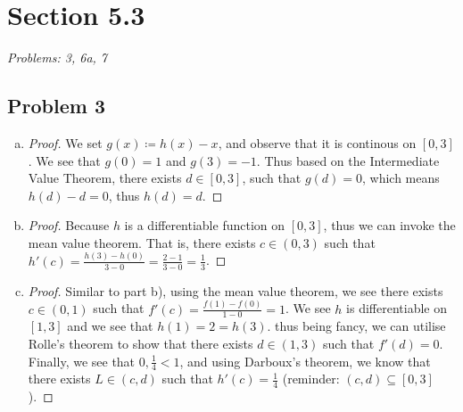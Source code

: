 \documentclass[12pt]{article}
\begin{document}

\section*{Section 5.3}
\textit{Problems: 3, 6a, 7}
\subsection*{Problem 3}
\begin{enumerate}[a).]
    \item {
        \begin{proof}
            We set $g(x) \coloneq h(x) - x$, and observe that it is continous on $[0,3]$.
            We see that $g(0) = 1$ and $g(3) = -1$. 
            Thus based on the Intermediate Value Theorem, there exists $d \in [0,3]$, such that $g(d) = 0$, which means $h(d) - d = 0$, thus $h(d) = d$. 
        \end{proof}
    }
    \item {
        \begin{proof}
            Because $h$ is a differentiable function on $[0,3]$, thus we can invoke the mean value theorem. 
            That is, there exists $c \in (0,3)$ such that $h'(c) = \frac{h(3) - h(0)}{3 - 0} = \frac{2 - 1}{3-0} = \frac{1}{3} $. 
        \end{proof}
    }
    \item {
        \begin{proof}
            Similar to part b), using the mean value theorem, we see there exists $c \in (0,1)$ such that $f'(c) = \frac{f(1) - f(0)}{ 1-0} = 1$. 
            We see $h$ is differentiable on $[1,3]$ and we see that $h(1) = 2 = h(3)$.
            thus being fancy, we can utilise Rolle's theorem to show that there exists $d \in (1,3)$ such that $f'(d) = 0$. 
            Finally, we see that $0,\frac{1}{4} < 1$, and using Darboux's theorem, we know that there exists $L \in (c,d)$ such that $h'(c) = \frac{1}{4}$ (reminder: $(c,d) \subseteq [0,3]$). 
        \end{proof}
    }
\end{enumerate}
\end{document}
